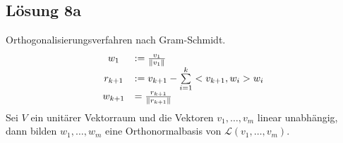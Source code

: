 \documentclass[main.tex]{subfiles}
\begin{document}
\subsection{Lösung 8a}
Orthogonalisierungsverfahren nach Gram-Schmidt.
\begin{equation*}
\begin{array}{ c l }
w_{1} & :=\frac{v_{1}}{\| v_{1} \| }\\
r_{k+1} & :=v_{k+1} -\sum\limits _{i=1}^{k}< v_{k+1} ,w_{i}> w_{i}\\
w_{k+1} & =\frac{r_{k+1}}{\| r_{k+1} \| }
\end{array}
\end{equation*}
Sei $V$ ein unitärer Vektorraum und die Vektoren $v_{1} ,\dotsc ,v_{m}$ linear unabhängig, dann bilden $w_{1} ,\dotsc ,w_{m}$ eine Orthonormalbasis von $\mathcal{L}( v_{1} ,\dotsc ,v_{m})$.
\end{document}
